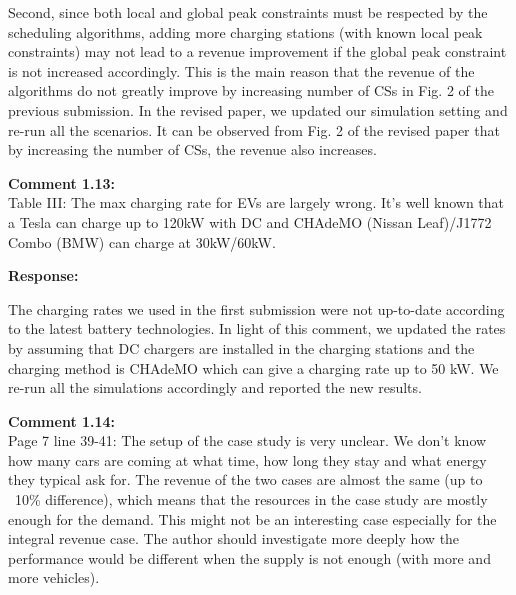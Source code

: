 \documentclass[11pt]{article}
\begin{document}
Second, since both local and global peak constraints must be respected by the scheduling algorithms, adding more charging stations (with known local peak constraints) may not lead to a revenue improvement if the global peak constraint is not increased accordingly. %
This is the main reason that the revenue of the algorithms do not greatly improve by increasing number of CSs in Fig. 2 of the previous submission. In the revised paper, we updated our simulation setting and re-run all the scenarios. It can be observed from Fig. 2 of the revised paper that by increasing the number of CSs, the revenue also increases.



\vspace{5mm}
{
{\color{blue}\noindent\textbf{Comment 1.13:}\\
Table III: The max charging rate for EVs are largely wrong. It's well known that a Tesla can charge up to 120kW with DC and CHAdeMO (Nissan Leaf)/J1772 Combo (BMW) can charge at 30kW/60kW.
}}

\vspace{5mm}
\noindent\textbf{Response:}

The charging rates we used in the first submission were not up-to-date according to the latest battery technologies. 
In light of this comment, we updated the rates by assuming that DC chargers are installed in the charging stations and the charging method is CHAdeMO which can give a charging rate up to 50 kW. We re-run all the simulations accordingly and  reported the new results. 

\vspace{5mm}
{
{\color{blue}\noindent\textbf{Comment 1.14:}\\
Page 7 line 39-41: The setup of the case study is very unclear. We don’t know how many cars are coming at what time, how long they stay and what energy they typical ask for. The revenue of the two cases are almost the same (up to ~10\% difference), which means that the resources in the case study are mostly enough for the demand. This might not be an interesting case especially for the integral revenue case. The author should investigate more deeply how the performance would be different when the supply is not enough (with more and more vehicles). 
}}
\end{document}

